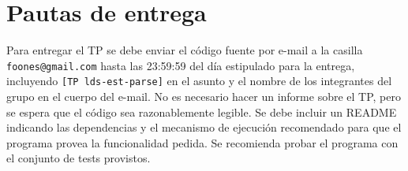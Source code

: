 \documentclass{article}
\begin{document}
\section{Pautas de entrega}

Para entregar el TP se debe enviar el c\'odigo fuente por e-mail
a la casilla \texttt{foones@gmail.com} hasta las 23:59:59 del d\'ia
estipulado para la entrega, incluyendo \texttt{[TP lds-est-parse]} en
el asunto y el nombre de los integrantes del grupo en el cuerpo
del e-mail. No es necesario hacer un informe sobre el TP, pero se espera
que el c\'odigo sea razonablemente legible.
Se debe incluir un README
indicando las dependencias y el mecanismo de ejecuci\'on
recomendado para que el programa provea la funcionalidad pedida.
Se recomienda probar el programa con el conjunto de tests provistos.
\end{document}
